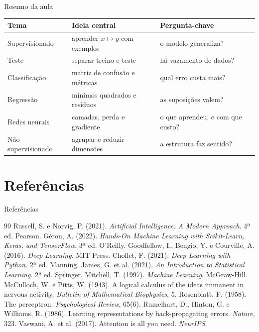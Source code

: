 \documentclass[10pt]{beamer}
\begin{document}
\begin{frame}{Resumo da aula}
\small
\begin{tabularx}{\textwidth}{@{}l X X@{}}
\toprule
\textbf{Tema} & \textbf{Ideia central} & \textbf{Pergunta-chave} \\
\midrule
Supervisionado & aprender $x\mapsto y$ com exemplos & o modelo generaliza? \\
Teste & separar treino e teste & há vazamento de dados? \\
Classificação & matriz de confusão e métricas & qual erro custa mais? \\
Regressão & mínimos quadrados e resíduos & as suposições valem? \\
Redes neurais & camadas, perda e gradiente & o que aprendeu, e com que custo? \\
Não supervisionado & agrupar e reduzir dimensões & a estrutura faz sentido? \\
\bottomrule
\end{tabularx}
\end{frame}

\section{Referências}

\begin{frame}[t,allowframebreaks]{Referências}
\footnotesize
\begin{thebibliography}{99}
 Russell, S. e Norvig, P. (2021). \textit{Artificial Intelligence: A Modern Approach}. 4ª ed. Pearson.
 Géron, A. (2022). \textit{Hands-On Machine Learning with Scikit-Learn, Keras, and TensorFlow}. 3ª ed. O'Reilly.
 Goodfellow, I., Bengio, Y. e Courville, A. (2016). \textit{Deep Learning}. MIT Press.
 Chollet, F. (2021). \textit{Deep Learning with Python}. 2ª ed. Manning.
 James, G. et al. (2021). \textit{An Introduction to Statistical Learning}. 2ª ed. Springer.
 Mitchell, T. (1997). \textit{Machine Learning}. McGraw-Hill.
 McCulloch, W. e Pitts, W. (1943). A logical calculus of the ideas immanent in nervous activity. \textit{Bulletin of Mathematical Biophysics}, 5.
 Rosenblatt, F. (1958). The perceptron. \textit{Psychological Review}, 65(6).
 Rumelhart, D., Hinton, G. e Williams, R. (1986). Learning representations by back-propagating errors. \textit{Nature}, 323.
 Vaswani, A. et al. (2017). Attention is all you need. \textit{NeurIPS}.
\end{thebibliography}
\end{frame}

\begin{frame}
\titlepage
\end{frame}
\end{document}
